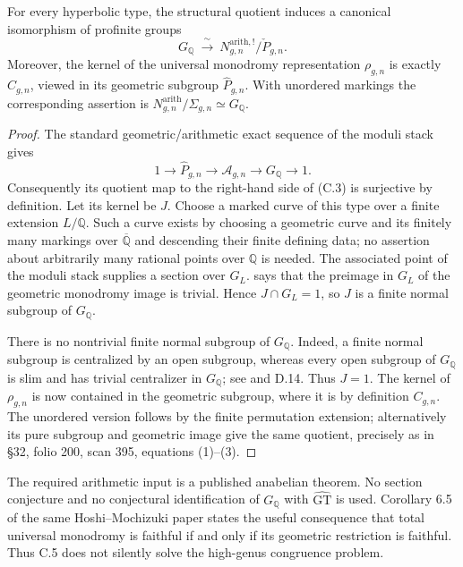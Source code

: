 For every hyperbolic type, the structural quotient induces a
canonical isomorphism of profinite groups
\[
 G_{\mathbb Q}\ \xrightarrow{\ \sim\ }\
 N^{\mathrm{arith},!}_{g,n}/\check P_{g,n}.
 \tag{C.3}
\]
Moreover, the kernel of the universal monodromy representation
$\rho_{g,n}$ is exactly $C_{g,n}$, viewed in its geometric
subgroup $\widehat P_{g,n}$.  With unordered markings the
corresponding assertion is
$N^{\mathrm{arith}}_{g,n}/\Sigma_{g,n}\simeq G_{\mathbb Q}$.

\begin{proof}
The standard geometric/arithmetic exact sequence of the moduli
stack gives
\[
 1\to\widehat P_{g,n}\to\mathcal A_{g,n}
 \to G_{\mathbb Q}\to1.
\]
Consequently its quotient map to the right-hand side of (C.3)
is surjective by definition.  Let its kernel be $J$.
Choose a marked curve of this type over a finite extension
$L/\mathbb Q$.  Such a curve exists by choosing a geometric
curve and its finitely many markings over $\overline{\mathbb Q}$
and descending their finite defining data; no assertion about
arbitrarily many rational points over $\mathbb Q$ is needed.
The associated point of the moduli stack supplies a section over
$G_L$.  \citet[Corollary 6.4, pp.~66--67]{HoshiMochizuki2011}
says that the preimage in $G_L$ of the geometric monodromy image
is trivial.  Hence $J\cap G_L=1$, so $J$ is a finite normal
subgroup of $G_{\mathbb Q}$.

There is no nontrivial finite normal subgroup of $G_{\mathbb Q}$.
Indeed, a finite normal subgroup is centralized by an open
subgroup, whereas every open subgroup of $G_{\mathbb Q}$ is
slim and has trivial centralizer in $G_{\mathbb Q}$; see
\citet[Corollary 2.2 in the published version; Corollary 1.3
in the author preprint]{Mochizuki2006} and D.14.
Thus $J=1$.  The kernel of $\rho_{g,n}$ is now contained in
the geometric subgroup, where it is by definition $C_{g,n}$.
The unordered version follows by the finite permutation
extension; alternatively its pure subgroup and geometric image
give the same quotient, precisely as in \S32, folio 200,
scan 395, equations (1)--(3).
\end{proof}

The required arithmetic input is a published anabelian theorem.
No section conjecture and no conjectural identification of
$G_{\mathbb Q}$ with $\widehat{\mathrm{GT}}$ is used.
Corollary 6.5 of the same Hoshi--Mochizuki paper states the useful
consequence that total universal monodromy is faithful if and only
if its geometric restriction is faithful.  Thus C.5 does not
silently solve the high-genus congruence problem.

